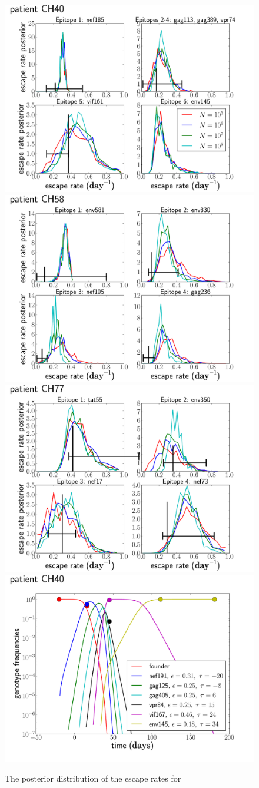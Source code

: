 \documentclass{frontiers}
\begin{document}
\begin{figure}[htp]
\begin{center}
  \includegraphics[width=0.49\columnwidth]{figures_manuscript/CH40_F_10_S_1_mu_1e-05_tau_20_posterior}
  \includegraphics[width=0.49\columnwidth]{figures_manuscript/CH58_F_10_S_1_mu_1e-05_tau_20_posterior}
  \includegraphics[width=0.49\columnwidth]{figures_manuscript/CH77_F_10_S_1_mu_1e-05_tau_20_posterior}
  \includegraphics[width=0.49\columnwidth]{figures_manuscript/CH40_F_10_S_1_tau_20_mu_1e-05_logN_7_most_likely_traj}
  \caption[labelInTOC]{The posterior distribution of the escape rates for
}
\end{center}
\end{figure}
\end{document}
